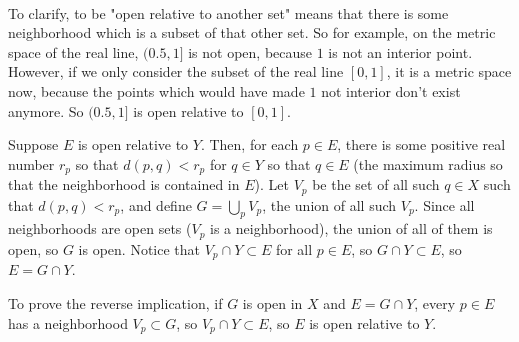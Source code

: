 \documentclass{article}
\begin{document}
\begin{customproof}
\


To clarify, to be "open relative to another set" means that there is some neighborhood which is a subset of that other set. So for example, on the metric space of the real line, $(0.5,1]$ is not open, because $1$ is not an interior point. However, if we only consider the subset of the real line $[0,1]$, it is a metric space now, because the points which would have made $1$ not interior don't exist anymore. So $(0.5,1]$ is open relative to $[0,1]$.

Suppose $E$ is open relative to $Y$. Then, for each $p \in E$, there is some positive real number $r_p$ so that $d(p,q) < r_p$ for $q \in Y$ so that $q \in E$ (the maximum radius so that the neighborhood is contained in $E$). Let $V_p$ be the set of all such $q \in X$ such that $d(p,q) < r_p$, and define $G = \bigcup_p V_p$, the union of all such $V_p$. Since all neighborhoods are open sets ($V_p$ is a neighborhood), the union of all of them is open, so $G$ is open. Notice that $V_p \cap Y \subset E$ for all $p \in E$, so $G \cap Y \subset E$, so $E = G \cap Y$.

To prove the reverse implication, if $G$ is open in $X$ and $E = G \cap Y$, every $p \in E$ has a neighborhood $V_p \subset G$, so $V_p \cap Y \subset E$, so $E$ is open relative to $Y$.
\end{customproof}
\end{document}
